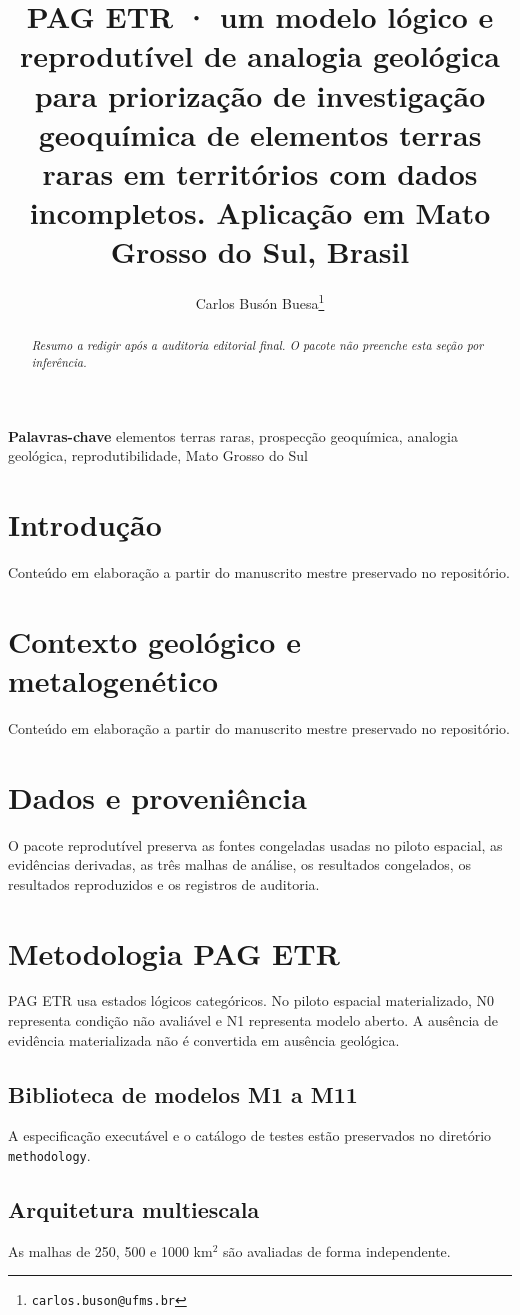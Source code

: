 \documentclass{article}
\title{PAG ETR · um modelo lógico e reprodutível de analogia geológica para priorização de investigação geoquímica de elementos terras raras em territórios com dados incompletos. Aplicação em Mato Grosso do Sul, Brasil}
\author[1]{Carlos Busón Buesa\thanks{\texttt{carlos.buson@ufms.br}}}
\affil[1]{Universidade Federal de Mato Grosso do Sul · Programa de Pós-Graduação em Tecnologias Ambientais · FAENG}
\date{}
\begin{document}
\maketitle

\begin{abstract}
\textit{Resumo a redigir após a auditoria editorial final. O pacote não preenche esta seção por inferência.}
\end{abstract}

\noindent\textbf{Palavras-chave} elementos terras raras, prospecção geoquímica, analogia geológica, reprodutibilidade, Mato Grosso do Sul

\section{Introdução}
Conteúdo em elaboração a partir do manuscrito mestre preservado no repositório.

\section{Contexto geológico e metalogenético}
Conteúdo em elaboração a partir do manuscrito mestre preservado no repositório.

\section{Dados e proveniência}
O pacote reprodutível preserva as fontes congeladas usadas no piloto espacial, as evidências derivadas, as três malhas de análise, os resultados congelados, os resultados reproduzidos e os registros de auditoria.

\section{Metodologia PAG ETR}
PAG ETR usa estados lógicos categóricos. No piloto espacial materializado, N0 representa condição não avaliável e N1 representa modelo aberto. A ausência de evidência materializada não é convertida em ausência geológica.

\subsection{Biblioteca de modelos M1 a M11}
A especificação executável e o catálogo de testes estão preservados no diretório \texttt{methodology}.

\subsection{Arquitetura multiescala}
As malhas de 250, 500 e 1000 km$^2$ são avaliadas de forma independente.
\end{document}
